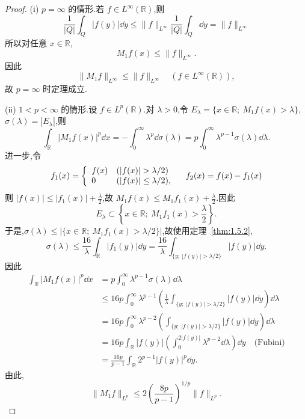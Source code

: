 \begin{proof}
(i) $p = \infty$ 的情形.若 $f \in L^{\infty}(\mathbb{R})$,则
\begin{equation*}
\frac{1}{|Q|}\int_{Q}|f(y)|\dd y \leq \| f \|_{L^{\infty}}\frac{1}{|Q|}\int_{Q}\dd y = \| f \|_{L^{\infty}}
\end{equation*}
所以对任意 $x \in \mathbb{R}$,
\begin{equation*}
M_{1}f(x) \leq \| f \|_{L^{\infty}}.
\end{equation*}
因此
\begin{equation*}
\| M_{1}f \|_{L^{\infty}} \leq \| f \|_{L^{\infty}} \quad (f \in L^{\infty}(\mathbb{R})),
\end{equation*}
故 $p = \infty$ 时定理成立.

(ii) $1 < p < \infty$ 的情形.设 $f \in L^{p}(\mathbb{R})$.对 $\lambda > 0$,令 $E_{\lambda} = \{x \in \mathbb{R};\ M_{1}f(x) > \lambda\}$,$\sigma(\lambda) = |E_{\lambda}|$,则
\begin{equation*}
\int_{\mathbb{R}}|M_{1}f(x)|^{p}\dd x = -\int_{0}^{\infty}\lambda^{p}\dd \sigma(\lambda) = p\int_{0}^{\infty}\lambda^{p-1}\sigma(\lambda)\dd \lambda.
\end{equation*}
进一步,令
\begin{equation*}
f_{1}(x) = \left\{ \begin{array}{l l}
f(x) & (|f(x)| > \lambda/2) \\
0 & (|f(x)| \leq \lambda/2),
\end{array} \right. \quad f_{2}(x) = f(x) - f_{1}(x)
\end{equation*}
则 $|f(x)| \leq |f_{1}(x)| + \frac{\lambda}{2}$,故 $M_{1}f(x) \leq M_{1}f_{1}(x) + \frac{\lambda}{2}$.因此
\begin{equation*}
E_{\lambda} \subset \left\{x \in \mathbb{R};\ M_{1}f_{1}(x) > \frac{\lambda}{2}\right\}.
\end{equation*}
于是,$\sigma(\lambda) \leq |\{x \in \mathbb{R};\ M_{1}f_{1}(x) > \lambda/2\}|$,故使用定理~\ref{thm:1.5.2},
\begin{equation*}
\sigma(\lambda) \leq \frac{16}{\lambda}\int_{\mathbb{R}}|f_{1}(y)|\dd y = \frac{16}{\lambda}\int_{\{y;\ |f(y)| > \lambda/2\}}|f(y)|\dd y.
\end{equation*}
因此
\begin{align*}
\int_{\mathbb{R}}|M_{1}f(x)|^{p}\dd x & = p\int_{0}^{\infty}\lambda^{p-1}\sigma(\lambda)\dd \lambda \\
& \leq 16p\int_{0}^{\infty}\lambda^{p-1}\left(\frac{1}{\lambda}\int_{\{y;\ |f(y)| > \lambda/2\}}|f(y)|\dd y\right)\dd \lambda \\
& = 16p\int_{0}^{\infty}\lambda^{p-2}\left(\int_{\{y;\ |f(y)| > \lambda/2\}}|f(y)|\dd y\right)\dd \lambda \\
& = 16p\int_{\mathbb{R}}|f(y)|\left(\int_{0}^{2|f(y)|}\lambda^{p-2}\dd \lambda\right)\dd y \quad \text{(Fubini)} \\
& = \frac{16p}{p - 1}\int_{\mathbb{R}}2^{p-1}|f(y)|^{p}\dd y.
\end{align*}
由此,
\begin{equation*}
\| M_{1}f \|_{L^{p}} \leq 2\left(\frac{8p}{p - 1}\right)^{1/p}\| f \|_{L^{p}}.
\end{equation*}
\end{proof}

